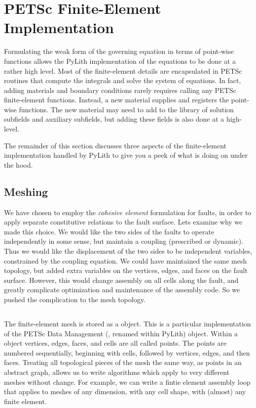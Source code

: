 \section{PETSc Finite-Element Implementation}

Formulating the weak form of the governing equation in terms of
point-wise functions allows the PyLith implementation of the equations
to be done at a rather high level. Most of the finite-element details
are encapsulated in PETSc routines that compute the integrals and
solve the system of equations. In fact, adding materials and boundary
conditions rarely requires calling any PETSc finite-element
functions. Instead, a new material supplies and registers the
point-wise functions. The new material may need to add to the library
of solution subfields and auxiliary subfields, but adding these fields
is also done at a high-level.

The remainder of this section discusses three aspects of the
finite-element implementation handled by PyLith to give you a peek of
what is doing on under the hood.

\subsection{Meshing}

We have chosen to employ the \textit{cohesive element} formulation for
faults, in order to apply separate constitutive relations to the fault
surface. Lets examine why we made this choice. We would like the two
sides of the faults to operate independently in some sense, but
maintain a coupling (prescribed or dynamic). Thus we would like the
displacement of the two sides to be independent variables, constrained
by the coupling equation. We could have maintained the same mesh
topology, but added extra variables on the vertices, edges, and faces
on the fault surface. However, this would change assembly on all cells
along the fault, and greatly complicate optimization and maintenance
of the assembly code. So we pushed the complication to the mesh
topology.

\subsection{}

The finite-element mesh is stored as a  object. This is
a particular implementation of the PETSc Data Management (,
renamed  within PyLith) object. Within a
 object vertices, edges, faces, and cells are all
called points. The points are numbered sequentially, beginning with
cells, followed by vertices, edges, and then faces. Treating all
topological pieces of the mesh the same way, as points in an abstract
graph, allows us to write algorithms which apply to very different
meshes without change. For example, we can write a fintie element
assembly loop that applies to meshes of any dimension, with any cell
shape, with (almost) any finite element.

